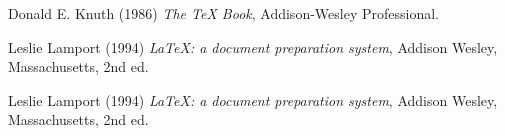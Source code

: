 \newpage
\setlength{\labelsep}{7mm}
\begin{thebibliography}{9}

    Donald E. Knuth (1986) \emph{The \TeX{} Book}, Addison-Wesley Professional.
    
    Leslie Lamport (1994) \emph{\LaTeX: a document preparation system}, Addison
    Wesley, Massachusetts, 2nd ed.

    Leslie Lamport (1994) \emph{\LaTeX: a document preparation system}, Addison
    Wesley, Massachusetts, 2nd ed.
\end{thebibliography}